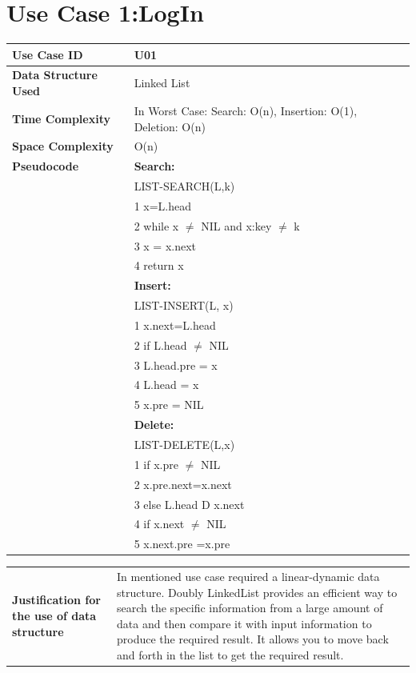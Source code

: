 \documentclass[12pt,a4paper]{report}
\begin{document}
\section{Use Case 1:LogIn}
\begin{center}
\begin{tabular}{ | m{4cm}|m{12cm}| }\hline
\textbf{Use Case ID}& U01 \\ \hline
\textbf{Data Structure Used}& Linked List \\ \hline

\textbf{Time Complexity}& 
In Worst Case: Search: O(n), Insertion: O(1), Deletion: O(n)\\\hline
\textbf{Space Complexity}& O(n)\\\hline

\textbf{Pseudocode}& 
\textbf{Search:} \\&
LIST-SEARCH(L,k)\\&
1 x=L.head\\&
2 while x $\neq$ NIL and x:key $\neq$ k \\&
3\hspace{6 mm} x = x.next\\&
4 return x\\&
\textbf{Insert:} \\&
LIST-INSERT(L, x) \\&
1 x.next=L.head \\&
2 if L.head $\neq$ NIL \\&
3\hspace{6 mm} L.head.pre = x \\&
4 L.head = x \\&
5 x.pre = NIL \\&
\textbf{Delete:} \\&
LIST-DELETE(L,x)\\&
1 if x.pre $\neq$ NIL\\&
2\hspace{6 mm} x.pre.next=x.next\\&
3 else L.head D x.next\\&
4 if x.next $\neq$ NIL\\&
5\hspace{6 mm} x.next.pre =x.pre
 \\ \hline
 \end{tabular}
\begin{tabular}{ | m{4cm}|m{12cm}| }\hline
\textbf{Justification for the use of data structure}&
In mentioned use case required a linear-dynamic data structure. 
Doubly LinkedList provides an efficient way to search the specific information from a large amount of data and then compare it with input information to produce the required result. It allows you to move back and forth in the list to get the required result.

\end{tabular}
\end{center}
\end{document}

